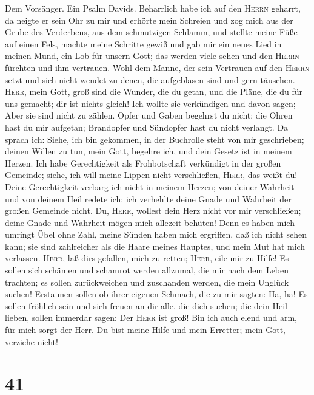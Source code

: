  Dem Vorsänger. Ein Psalm Davids. Beharrlich habe ich auf
den \textsc{Herrn} geharrt, da neigte er sein Ohr zu mir und erhörte
mein Schreien  und zog mich aus der Grube des Verderbens,
aus dem schmutzigen Schlamm, und stellte meine Füße auf einen Fels,
machte meine Schritte gewiß  und gab mir ein neues Lied in
meinen Mund, ein Lob für unsern Gott; das werden viele sehen und den
\textsc{Herrn} fürchten und ihm vertrauen.  Wohl dem
Manne, der sein Vertrauen auf den \textsc{Herrn} setzt und sich nicht
wendet zu denen, die aufgeblasen sind und gern täuschen. 
\textsc{Herr}, mein Gott, groß sind die Wunder, die du getan, und die
Pläne, die du für uns gemacht; dir ist nichts gleich! Ich wollte sie
verkündigen und davon sagen; Aber sie sind nicht zu zählen.
 Opfer und Gaben begehrst du nicht; die Ohren hast du mir
aufgetan; Brandopfer und Sündopfer hast du nicht verlangt.
 Da sprach ich: Siehe, ich bin gekommen, in der Buchrolle
steht von mir geschrieben;  deinen Willen zu tun, mein
Gott, begehre ich, und dein Gesetz ist in meinem Herzen. 
Ich habe Gerechtigkeit als Frohbotschaft verkündigt in der großen
Gemeinde; siehe, ich will meine Lippen nicht verschließen,
\textsc{Herr}, das weißt du!  Deine Gerechtigkeit verbarg
ich nicht in meinem Herzen; von deiner Wahrheit und von deinem Heil
redete ich; ich verhehlte deine Gnade und Wahrheit der großen Gemeinde
nicht.  Du, \textsc{Herr}, wollest dein Herz nicht vor
mir verschließen; deine Gnade und Wahrheit mögen mich allezeit behüten!
 Denn es haben mich umringt Übel ohne Zahl, meine Sünden
haben mich ergriffen, daß ich nicht sehen kann; sie sind zahlreicher als
die Haare meines Hauptes, und mein Mut hat mich verlassen.
 \textsc{Herr}, laß dir\textquotesingle s gefallen, mich
zu retten; \textsc{Herr}, eile mir zu Hilfe!  Es sollen
sich schämen und schamrot werden allzumal, die mir nach dem Leben
trachten; es sollen zurückweichen und zuschanden werden, die mein
Unglück suchen!  Erstaunen sollen ob ihrer eigenen
Schmach, die zu mir sagten: Ha, ha!  Es sollen fröhlich
sein und sich freuen an dir alle, die dich suchen; die dein Heil lieben,
sollen immerdar sagen: Der \textsc{Herr} ist groß!  Bin
ich auch elend und arm, für mich sorgt der Herr. Du bist meine Hilfe und
mein Erretter; mein Gott, verziehe nicht!

\hypertarget{section-40}{%
\section{41}\label{section-40}}

